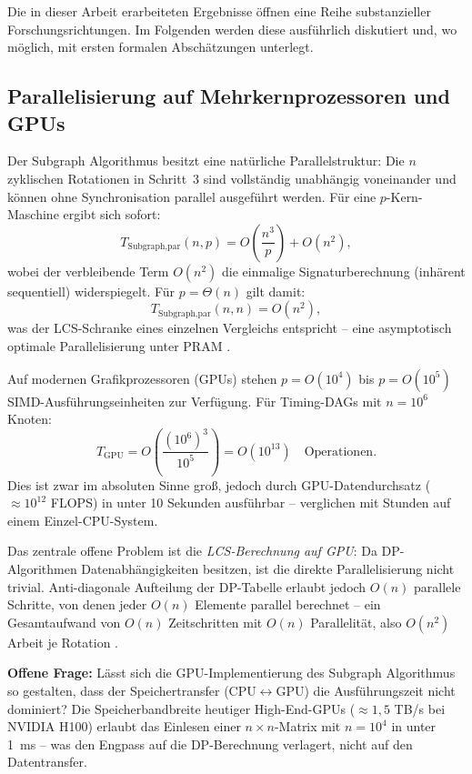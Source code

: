 ﻿\documentclass[a4paper,12pt]{article}
\theoremstyle{definition}
\begin{document}
Die in dieser Arbeit erarbeiteten Ergebnisse öffnen eine Reihe substanzieller
Forschungsrichtungen. Im Folgenden werden diese ausführlich diskutiert und, wo möglich,
mit ersten formalen Abschätzungen unterlegt.

\subsection{Parallelisierung auf Mehrkernprozessoren und GPUs}

Der Subgraph Algorithmus besitzt eine natürliche Parallelstruktur: Die $n$ zyklischen
Rotationen in Schritt~3 sind vollständig unabhängig voneinander und können ohne
Synchronisation parallel ausgeführt werden. Für eine $p$-Kern-Maschine ergibt sich
sofort:
\[
  T_{\text{Subgraph,par}}(n, p) = O\!\left(\frac{n^3}{p}\right) + O(n^2),
\]
wobei der verbleibende Term $O(n^2)$ die einmalige Signaturberechnung (inhärent
sequentiell) widerspiegelt. Für $p = \Theta(n)$ gilt damit:
\[
  T_{\text{Subgraph,par}}(n, n) = O(n^2),
\]
was der LCS-Schranke eines einzelnen Vergleichs entspricht -- eine asymptotisch optimale
Parallelisierung unter PRAM \cite{jaja1992introduction}.

Auf modernen Grafikprozessoren (GPUs) stehen $p = O(10^4)$ bis $p = O(10^5)$
SIMD-Ausführungseinheiten zur Verfügung. Für Timing-DAGs mit $n = 10^6$ Knoten:
\[
  T_{\text{GPU}} = O\!\left(\frac{(10^6)^3}{10^5}\right) = O(10^{13})
  \quad \text{Operationen.}
\]
Dies ist zwar im absoluten Sinne groß, jedoch durch GPU-Datendurchsatz
($\approx 10^{12}$ FLOPS) in unter 10 Sekunden ausführbar -- verglichen mit Stunden
auf einem Einzel-CPU-System.

Das zentrale offene Problem ist die \emph{LCS-Berechnung auf GPU}: Da DP-Algorithmen
Datenabhängigkeiten besitzen, ist die direkte Parallelisierung nicht trivial. Anti-diagonale
Aufteilung der DP-Tabelle erlaubt jedoch $O(n)$ parallele Schritte, von denen jeder
$O(n)$ Elemente parallel berechnet -- ein Gesamtaufwand von $O(n)$ Zeitschritten mit
$O(n)$ Parallelität, also $O(n^2)$ Arbeit je Rotation \cite{allison1986lcs}.

\textbf{Offene Frage:} Lässt sich die GPU-Implementierung des Subgraph Algorithmus
so gestalten, dass der Speichertransfer (CPU$\leftrightarrow$GPU) die Ausführungszeit
nicht dominiert? Die Speicherbandbreite heutiger High-End-GPUs ($\approx 1{,}5$ TB/s
bei NVIDIA H100) erlaubt das Einlesen einer $n \times n$-Matrix mit $n = 10^4$ in unter
1~ms -- was den Engpass auf die DP-Berechnung verlagert, nicht auf den Datentransfer.
\end{document}
